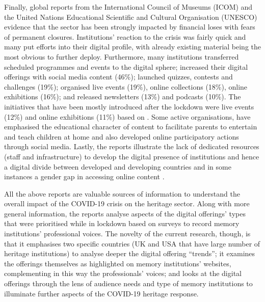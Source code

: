 \documentclass{egpubl}
\begin{document}
Finally, global reports from the International Council of Museums (ICOM) and the United Nations Educational Scientific and Cultural Organisation (UNESCO) evidence that the sector has been strongly impacted by financial loses with fears of permanent closures. Institutions' reaction to the crisis was fairly quick and many put efforts into their digital profile, with already existing material being the most obvious to further deploy. Furthermore, many institutions transferred scheduled programmes and events to the digital sphere; increased their digital offerings with social media content (46\%); launched quizzes, contests and challenges (19\%); organised live events (19\%), online collections (18\%), online exhibitions (16\%); and released newsletters (13\%) and podcasts (10\%). The initiatives that have  been mostly introduced after the lockdown were live events  (12\%) and online exhibitions (11\%)  based on \cite{InternationalCouncilofMuseums2020b}. Some active organisations, have emphasised the educational character of content to facilitate parents to entertain and teach children at home and also developed online participatory actions through social media. Lastly, the reports illustrate the lack of dedicated resources (staff and infrastructure) to develop the digital presence of institutions and hence a digital divide between developed and developing countries and in some instances a gender gap in accessing online content \cite{UNESCO2020,InternationalCouncilofMuseums2020b}.

All the above reports are valuable sources of information to understand the overall impact of the COVID-19 crisis on the heritage sector. Along with more general information, the reports analyse aspects of the digital offerings' types that were prioritised while in lockdown based on surveys to record memory institutions' professional voices. The novelty of the current research, though, is that it emphasises two specific countries (UK and USA that have large number of heritage institutions) to analyse deeper the digital offering ``trends''; it examines the offerings themselves as highlighted on memory institutions' websites, complementing in this way the professionals' voices; and looks at the digital offerings through the lens of audience needs and type of memory institutions to illuminate further aspects of the COVID-19 heritage response.

\end{document}
